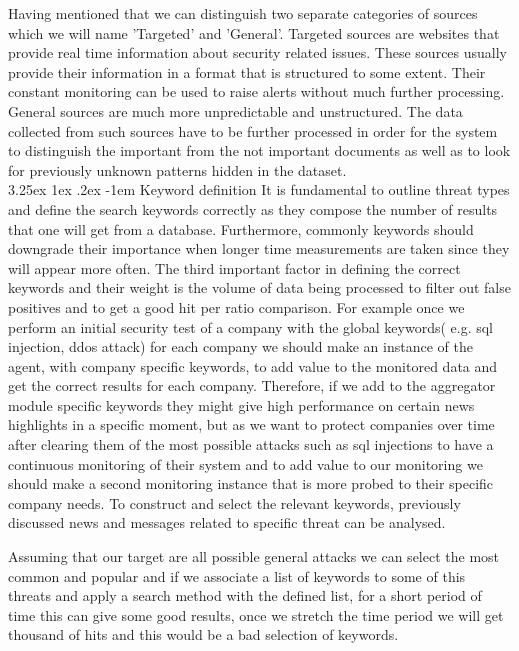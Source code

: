 \documentclass[12pt]{article}
\makeatletter
\renewcommand\paragraph{\@startsection{paragraph}{5}{\z@}%
  {3.25ex \@plus1ex \@minus.2ex}%
  {-1em}%
  {\normalfont\normalsize\bfseries}}
\makeatother
\begin{document}
Having mentioned that we can distinguish two separate categories of sources which we will name 'Targeted' and 'General'. Targeted sources are websites that provide real time information about security related issues. These sources usually provide their information in a format that is structured to some extent. Their constant monitoring can be used to raise alerts without much further processing.\\
General sources are much more unpredictable and unstructured. The data collected from such sources have to be further processed in order for the system to distinguish the important from the not important documents as well as to look for previously unknown patterns hidden in the dataset. \\

\paragraph{Keyword definition}
It is fundamental to outline threat types and define the search keywords correctly as they compose the number of results that one will get from a database. Furthermore, commonly keywords should downgrade their importance when longer time measurements are taken since they will appear more often. The third important factor in defining the correct keywords and their weight is the volume of data being processed to filter out false positives and to get a good hit per ratio comparison. For example once we perform an initial security test of a company with the global keywords( e.g. sql injection, ddos attack) for each company we should make an instance of the agent, with company specific keywords, to add value to the monitored data and get the correct results for each company. Therefore, if we add to the aggregator module specific keywords they might give high performance on certain news highlights in a specific moment, but as we want to protect companies over time after clearing them of the most possible attacks such as sql injections to have a continuous monitoring of their system and to add value to our monitoring we should make a second monitoring instance that is more probed to their specific company needs. To construct and select the relevant keywords, previously discussed news \cite{list-2015-attacks} and messages related to specific threat can be analysed. 

Assuming that our target are all possible general attacks we can select the most common and popular \cite{owasp} and if we associate a list of keywords to some of this threats and apply a search method with the defined list, for a short period of time this can give some good results, once we stretch the time period we will get thousand of hits and this would be a bad selection of keywords.\\
\end{document}
